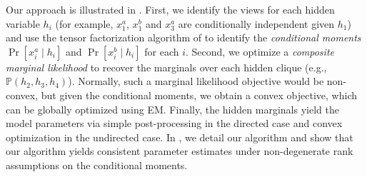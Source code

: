 
Our approach is illustrated in . 
First, we identify the views for each hidden variable $h_i$ (for example,
$x_1^a$, $x_1^b$ and $x_3^a$ are conditionally independent given $h_1$) and use
the tensor factorization algorithm of
\citet{anandkumar13tensor} to identify the \emph{conditional
moments} $\Pr[x_i^a \mid h_i]$ and $\Pr[x_i^b \mid h_i]$ for each $i$.
Second, we optimize a \emph{composite marginal likelihood} to recover the marginals over
each hidden clique (e.g., $\mathbb P(h_2, h_3, h_4)$).
Normally, such a marginal likelihood objective would be non-convex,
but given the conditional moments, we obtain a convex objective,
which can be globally optimized using EM.
Finally, the hidden marginals yield the model parameters
via simple post-processing in the directed case and convex optimization in the undirected case.
In , we detail our algorithm and
show that our algorithm yields consistent parameter estimates
under non-degenerate rank assumptions on the conditional moments.

